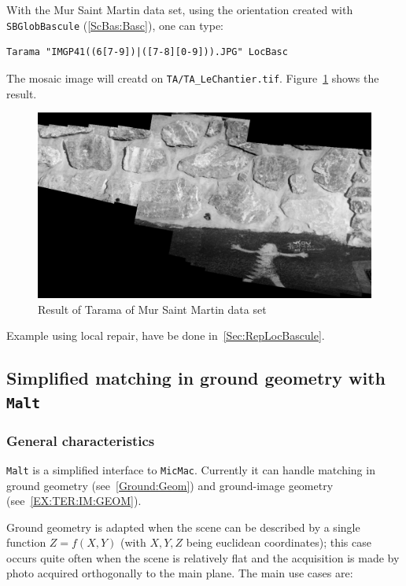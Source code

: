 With the Mur Saint Martin data set,  using the orientation created with
{\tt SBGlobBascule} (\ref{ScBas:Basc}), one can type:

\begin{verbatim}
Tarama "IMGP41((6[7-9])|([7-8][0-9])).JPG" LocBasc
\end{verbatim}

The mosaic image will creatd on {\tt TA/TA\_LeChantier.tif}. 
Figure~\ref{FIG:Rectif:StMartin} shows the result.


\begin{figure}
\begin{center}
\includegraphics[width=120mm]{FIGS/MurSaintMartin/TA_LeChantier.jpg}
\end{center}
\caption{Result of Tarama of Mur Saint Martin data set}
\label{FIG:Rectif:StMartin}
\end{figure}


Example using local repair, have be done in~\ref{Sec:RepLocBascule}.



\subsection{Simplified matching in ground geometry with {\tt Malt}}

\subsubsection{General characteristics}

{\tt Malt} is a simplified  interface to  {\tt MicMac}. Currently it can
handle matching in ground geometry (see~\ref{Ground:Geom}) and 
ground-image geometry (see~\ref{EX:TER:IM:GEOM}).


Ground geometry is adapted
when the scene can be described by a single function $Z=f(X,Y)$ (with $X,Y,Z$
being euclidean coordinates); this case occurs quite often when the
scene is relatively flat and the acquisition is made by photo acquired 
orthogonally to the main plane. The main use cases are:

